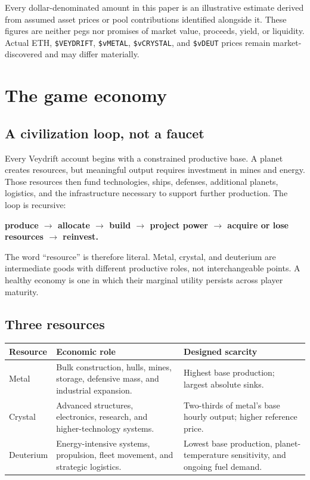 \documentclass[11pt]{article}
\newcommand{\token}[1]{\texttt{\$#1}}
\begin{document}
Every dollar-denominated amount in this paper is an illustrative estimate derived from assumed asset prices or pool contributions identified alongside it. These figures are neither pegs nor promises of market value, proceeds, yield, or liquidity. Actual ETH, \token{VEYDRIFT}, \token{vMETAL}, \token{vCRYSTAL}, and \token{vDEUT} prices remain market-discovered and may differ materially.

\section{The game economy}

\subsection{A civilization loop, not a faucet}

Every Veydrift account begins with a constrained productive base. A planet creates resources, but meaningful output requires investment in mines and energy. Those resources then fund technologies, ships, defenses, additional planets, logistics, and the infrastructure necessary to support further production. The loop is recursive:

\begin{center}
\textbf{produce $\rightarrow$ allocate $\rightarrow$ build $\rightarrow$ project power $\rightarrow$ acquire or lose resources $\rightarrow$ reinvest.}
\end{center}

The word ``resource'' is therefore literal. Metal, crystal, and deuterium are intermediate goods with different productive roles, not interchangeable points. A healthy economy is one in which their marginal utility persists across player maturity.

\subsection{Three resources}

\begin{tabularx}{\textwidth}{@{}p{}X X@{}}
\toprule
\textbf{Resource} & \textbf{Economic role} & \textbf{Designed scarcity} \\
\midrule
Metal & Bulk construction, hulls, mines, storage, defensive mass, and industrial expansion. & Highest base production; largest absolute sinks. \\
Crystal & Advanced structures, electronics, research, and higher-technology systems. & Two-thirds of metal's base hourly output; higher reference price. \\
Deuterium & Energy-intensive systems, propulsion, fleet movement, and strategic logistics. & Lowest base production, planet-temperature sensitivity, and ongoing fuel demand. \\
\bottomrule
\end{tabularx}
\end{document}

